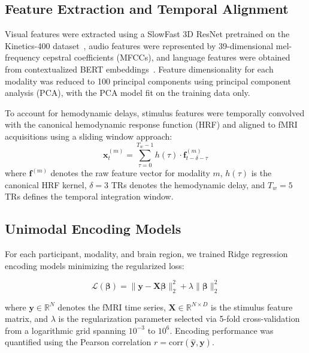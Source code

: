 \documentclass[10pt,letterpaper]{article}
\begin{document}
\subsection{Feature Extraction and Temporal Alignment}

Visual features were extracted using a SlowFast 3D ResNet pretrained on the Kinetics-400 dataset~\citep{feichtenhofer2019slowfast}, audio features were represented by 39-dimensional mel-frequency cepstral coefficients (MFCCs), and language features were obtained from contextualized BERT embeddings~\citep{devlin2019bert}. Feature dimensionality for each modality was reduced to 100 principal components using principal component analysis (PCA), with the PCA model fit on the training data only.

To account for hemodynamic delays, stimulus features were temporally convolved with the canonical hemodynamic response function (HRF) and aligned to fMRI acquisitions using a sliding window approach:
\begin{equation}\label{eq:xt}
\mathbf{x}_t^{(m)} = \sum_{\tau=0}^{T_w-1} h(\tau) \cdot \mathbf{f}_{t-\delta-\tau}^{(m)}
\end{equation}
where $\mathbf{f}^{(m)}$ denotes the raw feature vector for modality $m$, $h(\tau)$ is the canonical HRF kernel, $\delta = 3$ TRs denotes the hemodynamic delay, and $T_w = 5$ TRs defines the temporal integration window.

\subsection{Unimodal Encoding Models}

For each participant, modality, and brain region, we trained Ridge regression encoding models minimizing the regularized loss:

\begin{equation}\label{eq:L}
\mathcal{L}(\boldsymbol{\beta}) =
\lVert \mathbf{y} - \mathbf{X}\boldsymbol{\beta} \rVert_2^2
+ \lambda \lVert \boldsymbol{\beta} \rVert_2^2
\end{equation}

where $\mathbf{y} \in \mathbb{R}^N$ denotes the fMRI time series,
$\mathbf{X} \in \mathbb{R}^{N \times D}$ is the stimulus feature matrix,
and $\lambda$ is the regularization parameter selected via 5-fold cross-validation from a logarithmic grid spanning $10^{-3}$ to $10^{6}$.
Encoding performance was quantified using the Pearson correlation
$r = \mathrm{corr}(\hat{\mathbf{y}}, \mathbf{y})$.
\end{document}
